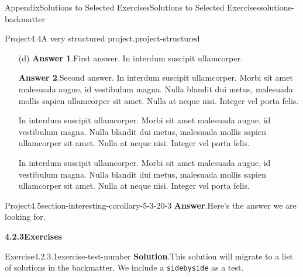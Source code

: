 \documentclass[twoside,10pt,]{article}
\newcommand{\blocktitlefont}{\relax}
\newcommand{\mono}[1]{\texttt{#1}}
\numberwithin{equation}{section}
\begin{document}
\begin{solutions-section}{Appendix}{Solutions to Selected Exercises}{}{Solutions to Selected Exercises}{}{}{solutions-backmatter}
\begin{projectsolution}{Project}{4.4}{A very structured project.}{project-structured}
\begin{enumerate}[font=\bfseries,label=(\alph*),ref=\alph*]
\begin{enumerate}[font=\bfseries,label=(\roman*),ref=\theenumi.\roman*]
\begin{solutionproof}{Proof}
In interdum suscipit ullamcorper. Morbi sit amet malesuada augue, id vestibulum magna. Nulla blandit dui metus, malesuada mollis sapien ullamcorper sit amet. Nulla at neque nisi. Integer vel porta felis.%
\end{solutionproof}
And a bit more to say.%
\item[(ii)]\noindent\textbf{\blocktitlefont Answer}.\hypertarget{project-structured-6-3-2-back}{}\quad{}Right!  In interdum suscipit ullamcorper. Morbi sit amet malesuada augue, id vestibulum magna. Nulla blandit dui metus, malesuada mollis sapien ullamcorper sit amet. Nulla at neque nisi. Integer vel porta felis.%
\end{enumerate}%
\item[(d)]\noindent\textbf{\blocktitlefont Answer 1}.\hypertarget{project-structured-7-3-back}{}\quad{}First answer.  In interdum suscipit ullamcorper.%
\par\smallskip%
\noindent\textbf{\blocktitlefont Answer 2}.\hypertarget{project-structured-7-4-back}{}\quad{}Second answer.  In interdum suscipit ullamcorper. Morbi sit amet malesuada augue, id vestibulum magna. Nulla blandit dui metus, malesuada mollis sapien ullamcorper sit amet. Nulla at neque nisi. Integer vel porta felis.%
\par
In interdum suscipit ullamcorper. Morbi sit amet malesuada augue, id vestibulum magna. Nulla blandit dui metus, malesuada mollis sapien ullamcorper sit amet. Nulla at neque nisi. Integer vel porta felis.%
\par
In interdum suscipit ullamcorper. Morbi sit amet malesuada augue, id vestibulum magna. Nulla blandit dui metus, malesuada mollis sapien ullamcorper sit amet. Nulla at neque nisi. Integer vel porta felis.%
\end{enumerate}%
\end{projectsolution}%
\begin{projectsolution}{Project}{4.5}{}{section-interesting-corollary-5-3-20-3}%
\noindent\textbf{\blocktitlefont Answer}.\hypertarget{section-interesting-corollary-5-3-20-3-2-back}{}\quad{}Here's the answer we are looking for.%
\end{projectsolution}%
\par\medskip
\noindent\textbf{\large{}4.2.3\space\textperiodcentered\space{}Exercises}
\begin{divisionsolution}{Exercise}{4.2.3.1}{}{exercise-test-number}%
\noindent\textbf{\blocktitlefont Solution}.\hypertarget{exercise-test-number-2-back}{}\quad{}This solution will migrate to a list of solutions in the backmatter.  We include a \mono{sidebyside} as a test.%

\end{divisionsolution}
\end{solutions-section}
\end{document}
